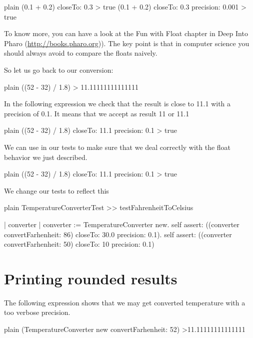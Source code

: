 \documentclass[10pt,twoside,english]{_support/latex/sbabook/sbabook}
\begin{document}
\begin{displaycode}{plain}
(0.1 + 0.2) closeTo: 0.3
> true
(0.1 + 0.2) closeTo: 0.3 precision: 0.001
> true
\end{displaycode}

To know more, you can have a look at the Fun with Float chapter in Deep Into Pharo (\url{http://books.pharo.org})). The key point is that in computer science you should always avoid to compare the floats naively.

So let us go back to our conversion: 

\begin{displaycode}{plain}
((52 - 32) / 1.8)
> 11.11111111111111
\end{displaycode}

In the following expression we check that the result is close to 11.1 with a precision of 0.1. It means that we
accept as result 11 or 11.1

\begin{displaycode}{plain}
((52 -  32) / 1.8) closeTo: 11.1 precision: 0.1
> true
\end{displaycode}

We can use  in our tests to make sure that we deal correctly with the float behavior we just described.

\begin{displaycode}{plain}
((52 -  32) / 1.8) closeTo: 11.1 precision: 0.1
> true
\end{displaycode}

We change our tests to reflect this 

\begin{displaycode}{plain}
TemperatureConverterTest >> testFahrenheitToCelsius

	| converter |
	converter := TemperatureConverter new. 
	self assert: ((converter convertFarhenheit: 86) closeTo: 30.0 precision: 0.1).
	self assert: ((converter convertFarhenheit: 50) closeTo: 10 precision: 0.1)
\end{displaycode}
\section{Printing rounded results}
The following expression shows that we may get converted temperature with a too verbose precision. 

\begin{displaycode}{plain}
(TemperatureConverter new convertFarhenheit: 52)
>11.11111111111111
\end{displaycode}
\end{document}
